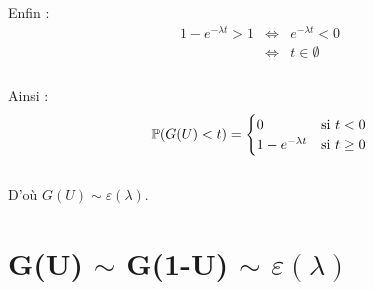 \documentclass[12,french]{report}
\begin{document}
Enfin :
$$\begin{array}{ccl}
	1-e^{-\lambda t}>1 & \iff & e^{-\lambda t}<0 \\
	& \iff & t\in\emptyset \\
  \end{array}$$\\
  
Ainsi :
$$\mathbb{P}(G(U)<t)=\begin{cases}
0 & \text{si \ensuremath{t<0}}\\
1-e^{-\lambda t} & \text{si }t\geq0
\end{cases}$$\\

D'où $G(U) \sim \varepsilon(\lambda)$.
 
\chapter{G(U) $\sim$ G(1-U) $\sim$ $\varepsilon(\lambda)$}
\end{document}
